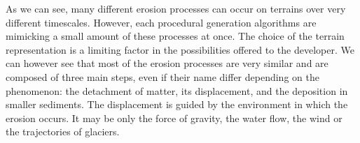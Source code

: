 \midConclusion

As we can see, many different erosion processes can occur on terrains over very different timescales. However, each procedural generation algorithms are mimicking a small amount of these processes at once. The choice of the terrain representation is a limiting factor in the possibilities offered to the developer. We can however see that most of the erosion processes are very similar and are composed of three main steps, even if their name differ depending on the phenomenon: the detachment of matter, its displacement, and the deposition in smaller sediments. The displacement is guided by the environment in which the erosion occurs. It may be only the force of gravity, the water flow, the wind or the trajectories of glaciers. 







